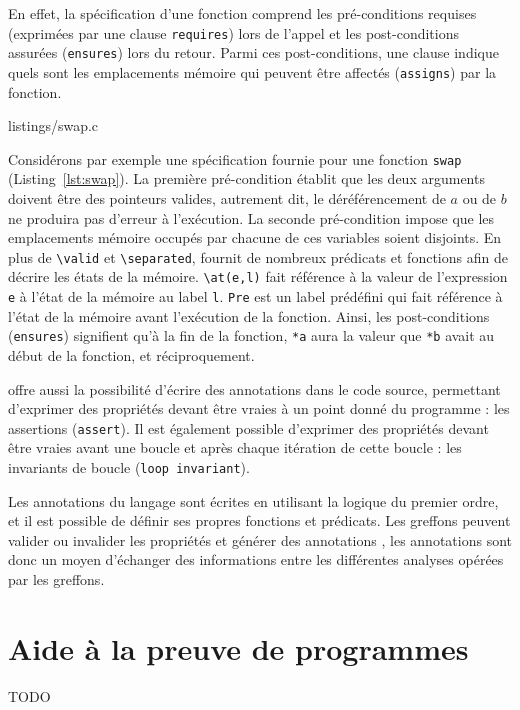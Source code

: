 En effet, la spécification d'une fonction comprend les pré-conditions requises
(exprimées par une clause \lstinline{requires}) lors de l'appel et les
post-conditions assurées (\lstinline{ensures}) lors du retour. Parmi ces
post-conditions, une clause indique quels sont les emplacements mémoire qui
peuvent être affectés (\lstinline{assigns}) par la fonction.



   {listings/swap.c}


Considérons par exemple une spécification fournie pour une fonction
\lstinline{swap}
(Listing~\ref{lst:swap}). La première pré-condition établit que les deux
arguments doivent être des pointeurs valides, autrement dit, le déréférencement
de $a$ ou de $b$ ne produira pas d'erreur à l'exécution. La seconde
pré-condition impose que les emplacements mémoire occupés par chacune de ces
variables soient disjoints. En plus de \lstinline{\valid} et
\lstinline{\separated}, \acsl fournit de nombreux prédicats et
fonctions afin de décrire les états de la mémoire. \lstinline{\at(e,l)}
fait référence à la valeur de l'expression \lstinline{e} à l'état de la mémoire
au label \lstinline{l}. \lstinline{Pre} est un label prédéfini qui fait
référence à l'état de la mémoire avant l'exécution de la fonction. Ainsi, les
post-conditions (\lstinline{ensures}) signifient qu'à la fin de la fonction,
\lstinline{*a} aura la valeur que \lstinline{*b} avait au
début de la fonction, et réciproquement.


\acsl offre aussi la possibilité d'écrire des annotations dans le code
source, permettant d'exprimer des propriétés devant être vraies à un point donné
du programme : les assertions (\lstinline{assert}).
Il est également possible d'exprimer des propriétés devant être vraies avant une
boucle et après chaque itération de cette boucle : les invariants de boucle
(\lstinline{loop invariant}).


Les annotations du langage \acsl sont écrites en utilisant la logique
du premier ordre, et il est possible de définir ses propres fonctions et
prédicats.
Les greffons peuvent valider ou invalider les propriétés \acsl et
générer des annotations \acsl, les annotations sont donc un moyen
d'échanger des informations entre les différentes analyses opérées par les
greffons.


\section{Aide à la preuve de programmes}


TODO
